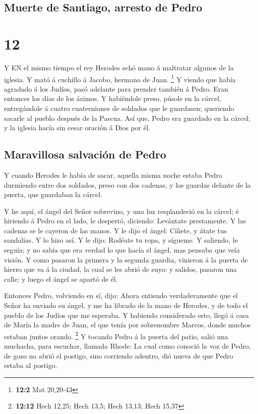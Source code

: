 \hypertarget{muerte-de-santiago-arresto-de-pedro}{%
\subsection{Muerte de Santiago, arresto de
Pedro}\label{muerte-de-santiago-arresto-de-pedro}}

\hypertarget{section-11}{%
\section{12}\label{section-11}}

 Y EN el mismo tiempo el rey Herodes echó mano á maltratar
algunos de la iglesia.  Y mató á cuchillo á Jacobo, hermano
de Juan. \footnote{\textbf{12:2} Mat 20,20-43}  Y viendo que
había agradado á los Judíos, pasó adelante para prender también á Pedro.
Eran entonces los días de los ázimos.  Y habiéndole preso,
púsole en la cárcel, entregándole á cuatro cuaterniones de soldados que
le guardasen; queriendo sacarle al pueblo después de la Pascua.
 Así que, Pedro era guardado en la cárcel; y la iglesia
hacía sin cesar oración á Dios por él.

\hypertarget{maravillosa-salvaciuxf3n-de-pedro}{%
\subsection{Maravillosa salvación de
Pedro}\label{maravillosa-salvaciuxf3n-de-pedro}}

 Y cuando Herodes le había de sacar, aquella misma noche
estaba Pedro durmiendo entre dos soldados, preso con dos cadenas, y los
guardas delante de la puerta, que guardaban la cárcel.

 Y he aquí, el ángel del Señor sobrevino, y una luz
resplandeció en la cárcel; é hiriendo á Pedro en el lado, le despertó,
diciendo: Levántate prestamente. Y las cadenas se le cayeron de las
manos.  Y le dijo el ángel: Cíñete, y átate tus sandalias. Y
lo hizo así. Y le dijo: Rodéate tu ropa, y sígueme.  Y
saliendo, le seguía; y no sabía que era verdad lo que hacía el ángel,
mas pensaba que veía visión.  Y como pasaron la primera y
la segunda guardia, vinieron á la puerta de hierro que va á la ciudad,
la cual se les abrió de suyo: y salidos, pasaron una calle; y luego el
ángel se apartó de él.

 Entonces Pedro, volviendo en sí, dijo: Ahora entiendo
verdaderamente que el Señor ha enviado su ángel, y me ha librado de la
mano de Herodes, y de todo el pueblo de los Judíos que me esperaba.
 Y habiendo considerado esto, llegó á casa de María la
madre de Juan, el que tenía por sobrenombre Marcos, donde muchos estaban
juntos orando. \footnote{\textbf{12:12} Hech 12,25; Hech 13,5; Hech
  13,13; Hech 15,37}  Y tocando Pedro á la puerta del
patio, salió una muchacha, para escuchar, llamada Rhode: 
La cual como conoció la voz de Pedro, de gozo no abrió el postigo, sino
corriendo adentro, dió nueva de que Pedro estaba al postigo.

